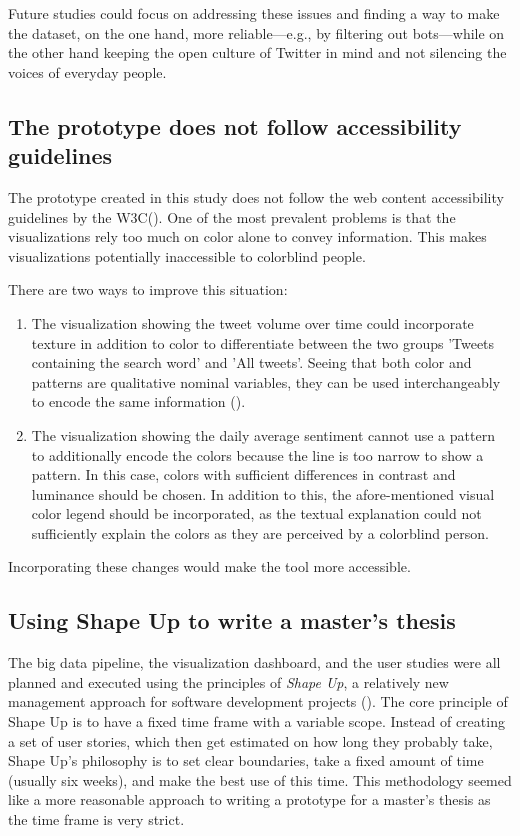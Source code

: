 Future studies could focus on addressing these issues and finding a way to make the dataset, on the one hand, more reliable---e.g., by filtering out bots---while on the other hand keeping the open culture of Twitter in mind and not silencing the voices of everyday people.

\subsection*{The prototype does not follow accessibility guidelines}
The prototype created in this study does not follow the web content accessibility guidelines by the W3C(\cite{iso2iec}). One of the most prevalent problems is that the visualizations rely too much on color alone to convey information. This makes visualizations potentially inaccessible to colorblind people.

There are two ways to improve this situation:

\begin{enumerate}
    \item The visualization showing the tweet volume over time could incorporate texture in addition to color to differentiate between the two groups 'Tweets containing the search word' and 'All tweets'. Seeing that both color and patterns are qualitative nominal variables, they can be used interchangeably to encode the same information (\cite{bornerDataVisualizationLiteracy2019}). %
    \item The visualization showing the daily average sentiment cannot use a pattern to additionally encode the colors because the line is too narrow to show a pattern. In this case, colors with sufficient differences in contrast and luminance should be chosen. In addition to this, the afore-mentioned visual color legend should be incorporated, as the textual explanation could not sufficiently explain the colors as they are perceived by a colorblind person.
\end{enumerate}

Incorporating these changes would make the tool more accessible.

\subsection*{Using Shape Up to write a master's thesis} \label{sec:shape_up}
The big data pipeline, the visualization dashboard, and the user studies were all planned and executed using the principles of \emph{Shape Up}, a relatively new management approach for software development projects (\cite{singerShapeStopRunning2019}). The core principle of Shape Up is to have a fixed time frame with a variable scope. Instead of creating a set of user stories, which then get estimated on how long they probably take, Shape Up's philosophy is to set clear boundaries, take a fixed amount of time (usually six weeks), and make the best use of this time. This methodology seemed like a more reasonable approach to writing a prototype for a master's thesis as the time frame is very strict.

